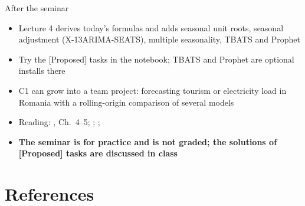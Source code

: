 \begin{frame}{After the seminar}
\itemsize{\small}
\begin{itemize}
    \item Lecture 4 derives today's formulas and adds seasonal unit roots, seasonal adjustment (X-13ARIMA-SEATS), multiple seasonality, TBATS and Prophet
    \item Try the [Proposed] tasks in the notebook; TBATS and Prophet are optional installs there
    \item C1 can grow into a team project: forecasting tourism or electricity load in Romania with a rolling-origin comparison of several models
    \item Reading: , Ch.~4--5; ; ; 
    \item \textbf{The seminar is for practice and is not graded; the solutions of [Proposed] tasks are discussed in class}
\end{itemize}
\end{frame}


\section{References}

